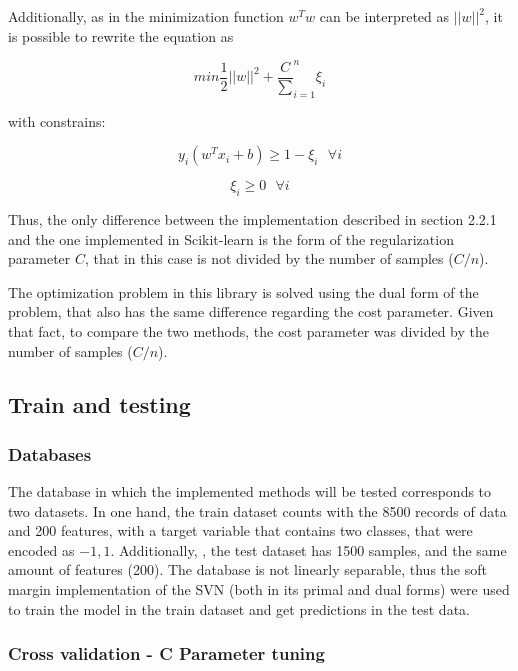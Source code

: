 \documentclass[11pt,twocolumn,letterpaper]{article}
\begin{document}
Additionally, as in the minimization function $w^T w$ can be interpreted as  $||w||^2$, it is possible to rewrite the equation as 

\begin{equation}
	min \frac{1}{2}||w||^2 + \frac{C}\sum^n_{i=1}\xi_i
\end{equation}

with constrains:

\begin{equation}
	y_i(w^T x_i + b) \geq 1 - \xi_i \:\:\:\forall i
\end{equation}

\begin{equation}
	\xi_i  \geq 0 \:\:\: \forall i
\end{equation}

Thus, the only difference between the implementation described in section 2.2.1 and the one implemented in Scikit-learn is the form of the regularization parameter $C$, that in this case is not divided by the number of samples ($C/n$).  

The optimization problem in this library is solved using the dual form of the problem, that also has the same difference regarding the cost parameter. Given that fact, to compare the two methods, the cost parameter was divided by the number of samples ($C/n$).

\subsection{Train and testing}

\subsubsection{Databases}

The database in which the implemented methods will be tested corresponds to two datasets. In one hand, the train dataset counts with the 8500 records of data and 200 features, with a target variable that contains two classes, that were encoded as ${-1,1}$. Additionally, , the test dataset has 1500 samples, and the same amount of features (200). The database is not linearly separable, thus the soft margin implementation of the SVN (both in its primal and dual forms) were used to train the model in the train dataset and get predictions in the test data.

\subsubsection{Cross validation - C Parameter tuning}
\end{document}
